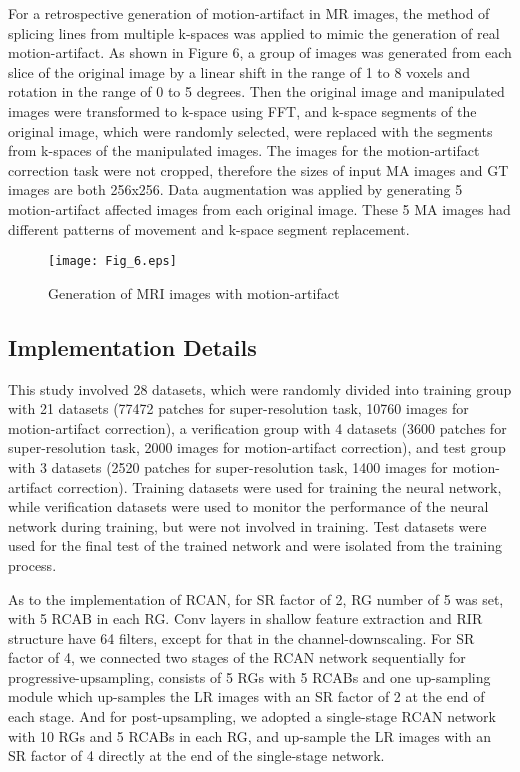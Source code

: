 \documentclass[runningheads]{llncs}
\begin{document}
For a retrospective generation of motion-artifact in MR images, the method of splicing lines from multiple k-spaces was applied to mimic the generation of real motion-artifact. As shown in Figure 6, a group of images was generated from each slice of the original image by a linear shift in the range of 1 to 8 voxels and rotation in the range of 0 to 5 degrees. Then the original image and manipulated images were transformed to k-space using FFT, and k-space segments of the original image, which were randomly selected, were replaced with the segments from k-spaces of the manipulated images. The images for the motion-artifact correction task were not cropped, therefore the sizes of input MA images and GT images are both 256x256. Data augmentation was applied by generating 5 motion-artifact affected images from each original image. These 5 MA images had different patterns of movement and k-space segment replacement.

\begin{figure}
\texttt{[image: Fig\_6.eps]}
\caption{Generation of MRI images with motion-artifact} \label{Fig_6}
\end{figure}

\subsection{Implementation Details}
This study involved 28 datasets, which were randomly divided into training group with 21 datasets (77472 patches for super-resolution task, 10760 images for motion-artifact correction), a verification group with 4 datasets (3600 patches for super-resolution task, 2000 images for motion-artifact correction), and test group with 3 datasets (2520 patches for super-resolution task, 1400 images for motion-artifact correction). Training datasets were used for training the neural network, while verification datasets were used to monitor the performance of the neural network during training, but were not involved in training. Test datasets were used for the final test of the trained network and were isolated from the training process.

As to the implementation of RCAN, for SR factor of 2, RG number of 5 was set, with 5 RCAB in each RG. Conv layers in shallow feature extraction and RIR structure have 64 filters, except for that in the channel-downscaling. For SR factor of 4, we connected two stages of the RCAN network sequentially for progressive-upsampling, consists of 5 RGs with 5 RCABs and one up-sampling module which up-samples the LR images with an SR factor of 2 at the end of each stage. And for post-upsampling, we adopted a single-stage RCAN network with 10 RGs and 5 RCABs in each RG, and up-sample the LR images with an SR factor of 4 directly at the end of the single-stage network.
\end{document}
